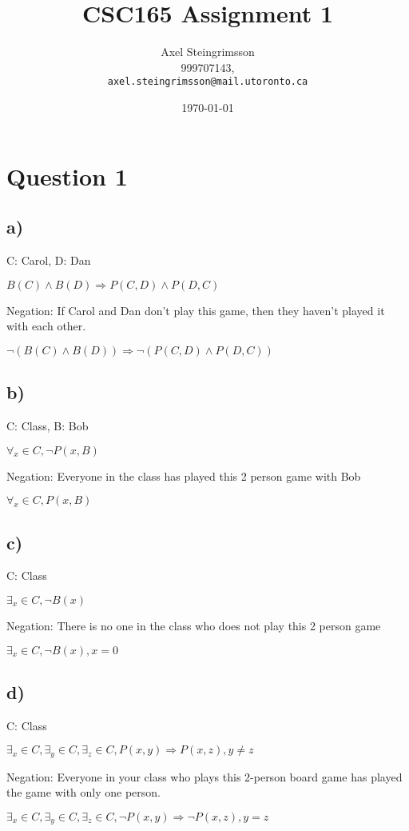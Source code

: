 \documentclass[11pt, oneside]{article}   	%
\title{CSC165 Assignment 1}
\author{Axel Steingrimsson\\
  999707143,\\
  \texttt{axel.steingrimsson@mail.utoronto.ca}}
\date{\today}						%
\begin{document}
\maketitle




\section{Question 1}

\subsection{a)}
C: Carol, D: Dan

$B(C) \land B(D) \Rightarrow P(C, D) \land P(D, C)$

Negation: If Carol and Dan don't play this game, then they haven't played it with each other.

$\neg(B(C) \land B(D)) \Rightarrow \neg(P(C, D) \land P(D, C))$
\subsection{b)}
C: Class, B: Bob

$\forall_x \in C, \neg P(x, B)$

Negation: Everyone in the class has played this 2 person game with Bob

$\forall_x \in C, P(x, B)$

\subsection{c)}
C: Class 

$\exists_x \in C, \neg B(x)$

Negation: There is no one in the class who does not play this 2 person game

$\exists_x \in C, \neg B(x), x = 0$

\subsection{d)}
C: Class

$\exists_x \in C, \exists_y \in C, \exists_z \in C, P(x, y) \Rightarrow P(x, z), y \neq z$

Negation: Everyone in your class who plays this 2-person board game has played the game with only one person. 

$\exists_x \in C, \exists_y \in C, \exists_z \in C, \neg P(x, y) \Rightarrow \neg P(x, z), y = z$
\end{document}
